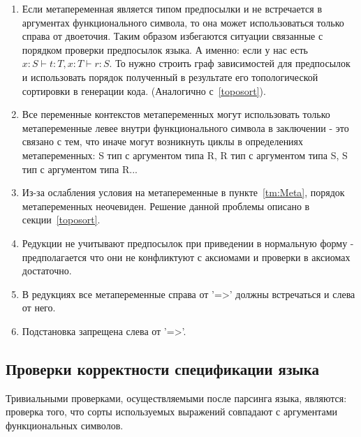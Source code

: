 \begin{enumerate}
\item Если метапеременная является типом предпосылки и не встречается в аргументах функционального символа, то она может использоваться только справа от двоеточия. Таким образом избегаются ситуации связанные с порядком проверки предпосылок языка. А именно: если у нас есть $x : S \vdash t : T, x:T \vdash r : S$. То нужно строить граф зависимостей для предпосылок и использовать порядок полученный в результате его топологической сортировки в генерации кода. (Аналогично с~\ref{toposort}).

\item Все переменные контекстов метапеременных могут использовать только метапеременные левее внутри функционального символа в заключении - это связано с тем, что иначе могут возникнуть циклы в определениях метапеременных: S тип с аргументом типа R, R тип с аргументом типа S, S тип с аргументом типа R...

\item Из-за ослабления условия на метапеременные в пункте~\ref{tm:Meta}, порядок метапеременных неочевиден. Решение данной проблемы описано в секции~\ref{toposort}.

\item Редукции не учитывают предпосылок при приведении в нормальную форму - предполагается что они не конфликтуют с аксиомами и проверки в аксиомах достаточно.

\item В редукциях все метапеременные справа от '=>' должны встречаться и слева от него.

\item Подстановка запрещена слева от '=>'.



\end{enumerate}

\subsection{Проверки корректности спецификации языка}

Тривиальными проверками, осуществляемыми после парсинга языка, являются: проверка того, что сорты используемых выражений совпадают с аргументами функциональных символов.
